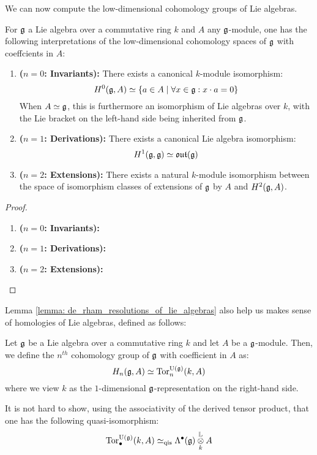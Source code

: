             We can now compute the low-dimensional cohomology groups of Lie algebras.
            \begin{proposition} \label{prop: low_dimensional_cohomologies_of_lie_algebras}
                For $\mathfrak{g}$ a Lie algebra over a commutative ring $k$ and $A$ any $\mathfrak{g}$-module, one has the following interpretations of the low-dimensional cohomology spaces of $\mathfrak{g}$ with coeffcients in $A$:
                \begin{enumerate}
                    \item \textbf{($n = 0$: Invariants):} There exists a canonical $k$-module isomorphism:
                        $$H^0(\mathfrak{g}, A) \simeq \{a \in A \mid \forall x \in \mathfrak{g}: x \cdot a = 0\}$$
                    When $A \simeq \mathfrak{g}$, this is furthermore an isomorphism of Lie algebras over $k$, with the Lie bracket on the left-hand side being inherited from $\mathfrak{g}$.
                    \item \textbf{($n = 1$: Derivations):} There exists a canonical Lie algebra isomorphism:
                        $$H^1(\mathfrak{g}, \mathfrak{g}) \simeq \mathfrak{out}(\mathfrak{g})$$
                    \item \textbf{($n = 2$: Extensions):} There exists a natural $k$-module isomorphism between the space of isomorphism classes of extensions of $\mathfrak{g}$ by $A$ and $H^2(\mathfrak{g}, A)$.
                \end{enumerate}
            \end{proposition}
                \begin{proof}
                    \noindent
                    \begin{enumerate}
                        \item \textbf{($n = 0$: Invariants):}
                        \item \textbf{($n = 1$: Derivations):}
                        \item \textbf{($n = 2$: Extensions):}
                    \end{enumerate}
                \end{proof}
            
            Lemma \ref{lemma: de_rham_resolutions_of_lie_algebras} also help us makes sense of homologies of Lie algebras, defined as follows:
            \begin{definition} \label{def: lie_algebra_homologies}
                Let $\mathfrak{g}$ be a Lie algebra over a commutative ring $k$ and let $A$ be a $\mathfrak{g}$-module. Then, we define the $n^{th}$ cohomology group of $\mathfrak{g}$ with coefficient in $A$ as:
                    $$H_n(\mathfrak{g}, A) \simeq \mathrm{Tor}_n^{\mathrm{U}(\mathfrak{g})}(k, A)$$
                where we view $k$ as the $1$-dimensional $\mathfrak{g}$-representation on the right-hand side. 
            \end{definition}
            \begin{remark}
                It is not hard to show, using the associativity of the derived tensor product, that one has the following quasi-isomorphism:
                    $$\Tor_{\bullet}^{\U(\g)}(k, A) \cong_{\qis} \Lambda^{\bullet}(\g) \tensor_k^{\L} A$$
            \end{remark}
        
